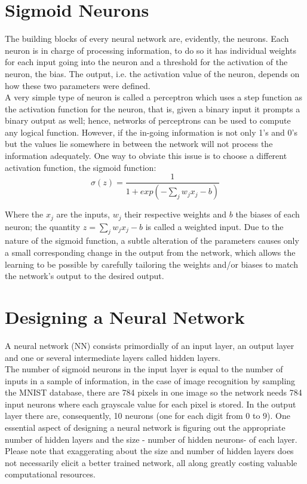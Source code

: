 \section{Sigmoid Neurons}\label{sigNeuron}
The building blocks of every neural network are, evidently, the neurons. Each neuron is in charge of processing information, to do so it has individual weights for each input going into the neuron and a threshold for the activation of the neuron, the bias. The output, i.e. the activation value of the neuron, depends on how these two parameters were defined.\\
A very simple type of neuron is called a perceptron which uses a step function as the activation function for the neuron, that is, given a binary input it prompts a binary output as well; hence, networks of perceptrons can be used to compute any logical function. However, if the in-going information is not only 1's and 0's but the values lie somewhere in between the network will not process the information adequately. One way to obviate this issue is to choose a different activation function, the sigmoid function:
\begin{equation}
    \sigma(z) = \frac{1}{1 + exp(- \sum_j w_j x_j -b)}
\end{equation}

Where the $x_j$ are the inputs, $w_j$ their respective weights and $b$ the biases of each neuron; the quantity $z =\sum_j w_jx_j - b$ is called a weighted input. Due to the nature of the sigmoid function, a subtle alteration of the parameters causes only a small corresponding change in the output from the network, which allows the learning to be possible by carefully tailoring the weights and/or biases to match the network's output to the desired output.
 
\section{Designing a Neural Network}\label{designNN}

A neural network (NN) consists primordially of an input layer, an output layer and one or several intermediate layers called hidden layers.\\
The number of sigmoid neurons in the input layer is equal to the number of inputs in a sample of information, in the case of image recognition by sampling the MNIST database, there are 784 pixels in one image so the network needs 784 input neurons where each grayscale value for each pixel is stored. In the output layer there are, consequently, 10 neurons (one for each digit from 0 to 9). One essential aspect of designing a neural network is figuring out the appropriate number of hidden layers and the size - number of hidden neurons- of each layer. Please note that exaggerating about the size and number of hidden layers does not necessarily elicit a better trained network, all along greatly costing valuable computational resources.

